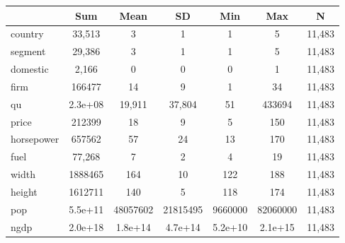 {
\def\sym#1{\ifmmode^{#1}\else\(^{#1}\)\fi}
\begin{tabular}{l*{1}{cccccc}}
\toprule
            &         Sum&        Mean&          SD&         Min&         Max&           N\\
\midrule
country     &      33,513&           3&           1&           1&           5&      11,483\\
segment     &      29,386&           3&           1&           1&           5&      11,483\\
domestic    &       2,166&           0&           0&           0&           1&      11,483\\
firm        &      166477&          14&           9&           1&          34&      11,483\\
qu          &     2.3e+08&      19,911&      37,804&          51&      433694&      11,483\\
price       &      212399&          18&           9&           5&         150&      11,483\\
horsepower  &      657562&          57&          24&          13&         170&      11,483\\
fuel        &      77,268&           7&           2&           4&          19&      11,483\\
width       &     1888465&         164&          10&         122&         188&      11,483\\
height      &     1612711&         140&           5&         118&         174&      11,483\\
pop         &     5.5e+11&    48057602&    21815495&     9660000&    82060000&      11,483\\
ngdp        &     2.0e+18&     1.8e+14&     4.7e+14&     5.2e+10&     2.1e+15&      11,483\\
\bottomrule
\end{tabular}
}
